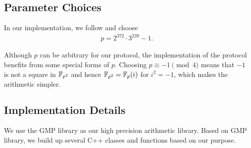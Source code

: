 
\subsection{Parameter Choices}

In our implementation, we follow \cite{C:CosLonNae16} and choose
\begin{align*}
    p = 2^{372} \cdot 3^{239} - 1.
\end{align*}

Although $p$ can be arbitrary for our protocol, the implementation of the protocol benefits from some special forms of $p$. Choosing $p \equiv -1 \pmod 4$ means that $-1$ is not a square in $\mathbb{F}_{p^2}$ and hence $\mathbb{F}_{p^2} = \mathbb{F}_p(i)$ for $i^2 = -1$, which makes the arithmetic simpler.




\subsection{Implementation Details}

We use the GMP library \cite{Granlund12} as our high precision arithmetic library. Based on GMP library, we build up several C++ classes and functions based on our purpose.

